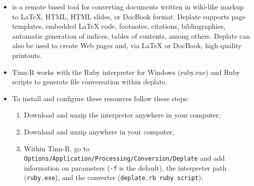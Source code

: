 \begin{itemize}
  \item {}
    is a remote
     based tool for
    converting documents written in wiki-like markup to LaTeX, HTML, HTML slides,
    or DocBook format. Deplate supports page templates, embedded LaTeX code,
    footnotes, citations, bibliographies, automatic generation of indices, tables
    of contents, among others. Deplate can also be used to create Web pages and,
    via LaTeX or DocBook, high-quality printouts.

  \item Tinn-R works with the Ruby interpreter for Windows (ruby.exe) and Ruby
    scripts to generate file conversation within deplate.

  \item To install and configure these resources follow these steps:
    \begin{enumerate}
      \item Download and unzip the
        interpreter anywhere in your computer;
      \item Download and unzip
        anywhere in your computer;
      \item Within Tinn-R, go to \texttt{Options/Application/Processing/Conversion/Deplate}
        and add information on parameters (\texttt{-f} is the default),
        the interpreter path (\texttt{ruby.exe}), and the converter
        (\texttt{deplate.rb ruby script});\\


\end{enumerate}
\end{itemize}
